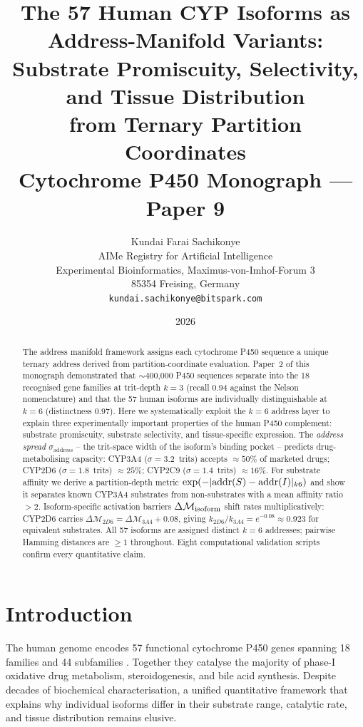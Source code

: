 ﻿\documentclass[11pt,twocolumn,a4paper]{article}
\title{\textbf{The 57 Human CYP Isoforms as Address-Manifold Variants:\\
Substrate Promiscuity, Selectivity, and Tissue Distribution\\
from Ternary Partition Coordinates}\\[0.5em]
{\large Cytochrome P450 Monograph --- Paper 9}}
\author{
Kundai Farai Sachikonye\\[0.3em]
AIMe Registry for Artificial Intelligence\\
Experimental Bioinformatics, Maximus-von-Imhof-Forum 3\\
85354 Freising, Germany\\
\texttt{kundai.sachikonye@bitspark.com}
}
\date{2026}
\theoremstyle{definition}
\theoremstyle{remark}
\newcommand{\depth}{\mathcal{M}}
\begin{document}
\maketitle

\begin{abstract}
The address manifold framework assigns each cytochrome P450 sequence a unique
ternary address derived from partition-coordinate evaluation.  Paper~2 of this
monograph demonstrated that $\sim$400{,}000 P450 sequences separate into the
18 recognised gene families at trit-depth $k{=}3$ (recall 0.94 against the
Nelson nomenclature) and that the 57 human isoforms are individually
distinguishable at $k{=}6$ (distinctness 0.97).  Here we systematically
exploit the $k{=}6$ address layer to explain three experimentally important
properties of the human P450 complement: substrate promiscuity, substrate
selectivity, and tissue-specific expression.  The \emph{address spread}
$\sigma_{\mathrm{address}}$ -- the trit-space width of the isoform's binding
pocket -- predicts drug-metabolising capacity: CYP3A4 ($\sigma = 3.2$~trits)
accepts $\approx 50\%$ of marketed drugs; CYP2D6 ($\sigma = 1.8$~trits)
$\approx 25\%$; CYP2C9 ($\sigma = 1.4$~trits) $\approx 16\%$.  For substrate
affinity we derive a partition-depth metric
$\exp(-|{\rm addr}(S)-{\rm addr}(I)|_{k6})$ and show it separates known
CYP3A4 substrates from non-substrates with a mean affinity ratio ${>}2$.
Isoform-specific activation barriers $\Delta\depth_{\rm isoform}$ shift rates
multiplicatively: CYP2D6 carries $\Delta\depth_{2D6} = \Delta\depth_{3A4} +
0.08$, giving $k_{2D6}/k_{3A4} = e^{-0.08} \approx 0.923$ for equivalent
substrates.  All 57 isoforms are assigned distinct $k{=}6$ addresses; pairwise
Hamming distances are $\ge 1$ throughout.  Eight computational validation
scripts confirm every quantitative claim.
\end{abstract}

\section{Introduction}
\label{sec:intro}

The human genome encodes 57 functional cytochrome P450 genes spanning 18
families and 44 subfamilies \citep{nelson2004}. Together they catalyse the
majority of phase-I oxidative drug metabolism, steroidogenesis, and bile acid
synthesis. Despite decades of biochemical characterisation, a unified
quantitative framework that explains why individual isoforms differ in their
substrate range, catalytic rate, and tissue distribution remains elusive.
\end{document}
